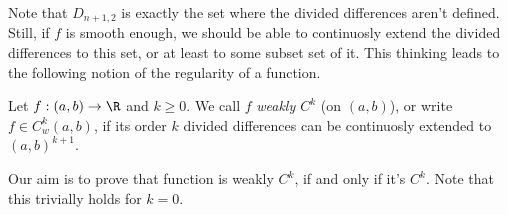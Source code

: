 Note that $D_{n + 1, 2}$ is exactly the set where the divided differences aren't defined. Still, if $f$ is smooth enough, we should be able to continuosly extend the divided differences to this set, or at least to some subset set of it. This thinking leads to the following notion of the regularity of a function.

\begin{maar}
	Let $f : (a, b) \to \R$ and $k \geq 0$. We call $f$ \textit{weakly $C^{k}$} (on $(a, b)$), or write $f \in C_{w}^{k}(a, b)$, if its order $k$ divided differences can be continuosly extended to $(a, b)^{k + 1}$.
\end{maar}

Our aim is to prove that function is weakly $C^{k}$, if and only if it's $C^{k}$. Note that this trivially holds for $k = 0$.

